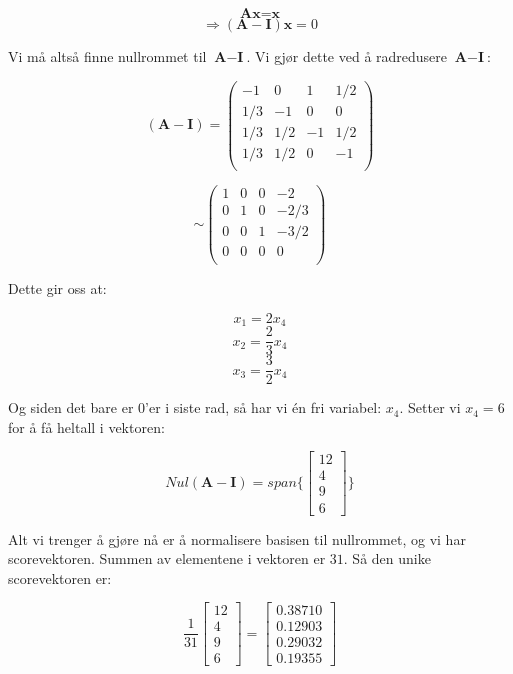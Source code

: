 \documentclass[a4paper,norsk,11pt,twoside]{article}
\begin{document}
$$
\textbf{A}\textbf{x} = \textbf{x}
$$
$$
\Rightarrow (\textbf{A} - \textbf{I})\textbf{x} = 0
$$

Vi må altså finne nullrommet til $\textbf{A} - \textbf{I}$. Vi gjør dette ved å radredusere $\textbf{A} - \textbf{I}$:

$$
(\textbf{A} - \textbf{I})
=\begin{pmatrix}
-1 & 0 & 1 & 1/2\\
1/3 & -1 & 0 & 0\\
1/3 & 1/2 & -1 & 1/2\\
1/3 & 1/2 & 0 & -1\\
\end{pmatrix}
$$

$$
\sim \begin{pmatrix}
1 & 0 & 0 & -2\\
0 & 1 & 0 & -2/3\\
0 & 0 & 1 & -3/2\\
0 & 0 & 0 & 0\\
\end{pmatrix}
$$

Dette gir oss at:

$$
x_1 = 2x_4
$$
$$
x_2 = \frac{2}{3}x_4
$$
$$
x_3 = \frac{3}{2}x_4
$$

Og siden det bare er 0'er i siste rad, så har vi én fri variabel: $x_4$. Setter vi $x_4 = 6$ for å få heltall i vektoren:

$$
Nul(\textbf{A} -\textbf{I}) = span\{ \begin{bmatrix}
12 \\ 4 \\ 9 \\ 6
\end{bmatrix} \}
$$

Alt vi trenger å gjøre nå er å normalisere basisen til nullrommet, og vi har scorevektoren. Summen av elementene i vektoren er $31$. Så den unike scorevektoren er:

$$
\frac{1}{31} \begin{bmatrix}
12 \\ 4 \\ 9 \\ 6
\end{bmatrix}
= \begin{bmatrix}
0.38710 \\ 0.12903 \\ 0.29032 \\ 0.19355
\end{bmatrix}
$$\\
\end{document}
